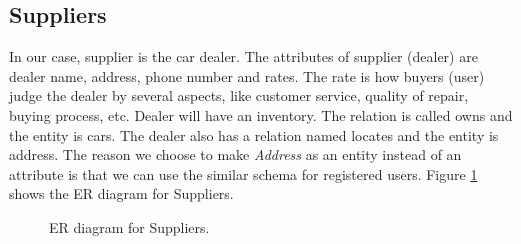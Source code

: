 \documentclass[12pt]{article}
\begin{document}
\subsection{Suppliers}
In our case, supplier is the car dealer. The attributes of supplier (dealer) are dealer name, address, phone number and rates. The rate is how buyers (user) judge the dealer by several aspects, like customer service, quality of repair, buying process, etc. Dealer will have an inventory. The relation is called owns and the entity is cars. The dealer also has a relation named locates and the entity is address. The reason we choose to make \emph{Address} as an entity instead of an attribute is that we can use the similar schema for registered users. Figure \ref{fig:ERSupp} shows the ER diagram for Suppliers.\\
\begin{figure}[!h]
\caption{ER diagram for Suppliers.\label{fig:ERSupp}}
\begin{center}
\end{center}
\end{figure}
\end{document}
